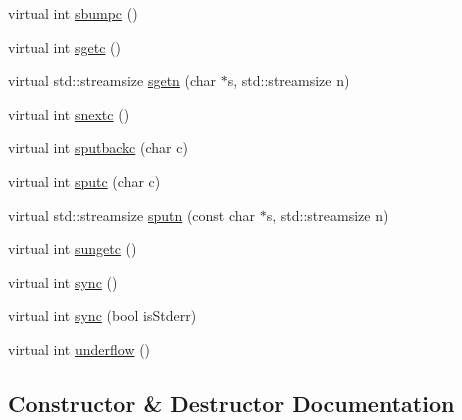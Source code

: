 \begin{DoxyCompactItemize}
\item 
virtual int \mbox{\hyperlink{classstanfordcpplib_1_1ForwardingStreambuf_a91a2d4b5d9c771f559543d68806820a6}{sbumpc}} ()
\item 
virtual int \mbox{\hyperlink{classstanfordcpplib_1_1ForwardingStreambuf_abf3bd66eb386006b5f74a7bcdf1c3b4b}{sgetc}} ()
\item 
virtual std\+::streamsize \mbox{\hyperlink{classstanfordcpplib_1_1ForwardingStreambuf_a117eab93aac941f3cee780c5c2ecf58b}{sgetn}} (char $\ast$s, std\+::streamsize n)
\item 
virtual int \mbox{\hyperlink{classstanfordcpplib_1_1ForwardingStreambuf_a17a9adc0f91f53a184f79fa84db9bca7}{snextc}} ()
\item 
virtual int \mbox{\hyperlink{classstanfordcpplib_1_1ForwardingStreambuf_a2d0d4eb097eb268d3c7181204d156689}{sputbackc}} (char c)
\item 
virtual int \mbox{\hyperlink{classstanfordcpplib_1_1ForwardingStreambuf_ac2e29fbc1c3df5e6a85172ddbcbacae9}{sputc}} (char c)
\item 
virtual std\+::streamsize \mbox{\hyperlink{classstanfordcpplib_1_1ForwardingStreambuf_a68372b953d8e4c4754586deb450fe84d}{sputn}} (const char $\ast$s, std\+::streamsize n)
\item 
virtual int \mbox{\hyperlink{classstanfordcpplib_1_1ForwardingStreambuf_a3c92fd32c60f1c7fe6c6b8c80a970465}{sungetc}} ()
\item 
virtual int \mbox{\hyperlink{classstanfordcpplib_1_1ForwardingStreambuf_a810a727ce5554d3178e17b6bc55025dd}{sync}} ()
\item 
virtual int \mbox{\hyperlink{classstanfordcpplib_1_1ForwardingStreambuf_ad5f4344df2a20a0000adb05d4e656855}{sync}} (bool is\+Stderr)
\item 
virtual int \mbox{\hyperlink{classstanfordcpplib_1_1ForwardingStreambuf_aeb6918bd44153b257e097e2d2ef370ef}{underflow}} ()
\end{DoxyCompactItemize}


\subsection{Constructor \& Destructor Documentation}
\mbox{\label{classstanfordcpplib_1_1ForwardingStreambuf_a8117dcf1a6c10e98afb196a6f1346dd9}} 
